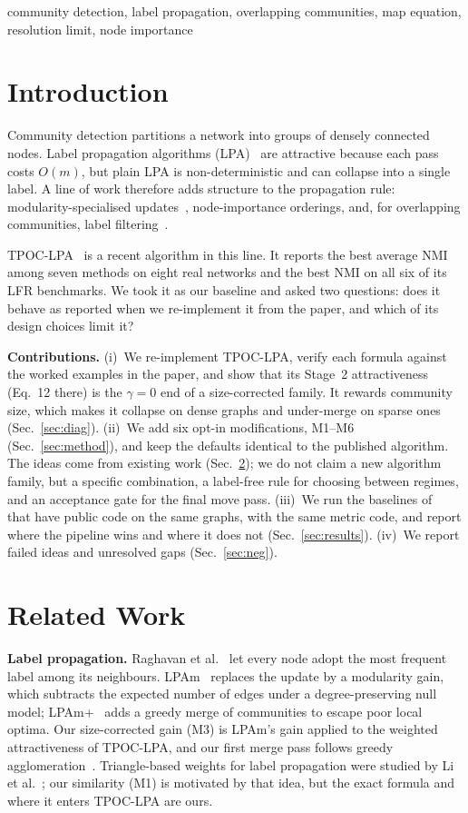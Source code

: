 \documentclass[conference]{IEEEtran}
\begin{document}
\begin{IEEEkeywords}
community detection, label propagation, overlapping communities, map equation, resolution limit, node importance
\end{IEEEkeywords}

\section{Introduction}
Community detection partitions a network into groups of densely connected nodes. Label propagation algorithms (LPA)~\cite{raghavan2007} are attractive because each pass costs $O(m)$, but plain LPA is non-deterministic and can collapse into a single label. A line of work therefore adds structure to the propagation rule: modularity-specialised updates~\cite{barber2009,liu2010}, node-importance orderings, and, for overlapping communities, label filtering~\cite{gregory2010,xie2011}.

TPOC-LPA~\cite{kong2026} is a recent algorithm in this line. It reports the best average NMI among seven methods on eight real networks and the best NMI on all six of its LFR benchmarks. We took it as our baseline and asked two questions: does it behave as reported when we re-implement it from the paper, and which of its design choices limit it?

\textbf{Contributions.}
(i)~We re-implement TPOC-LPA, verify each formula against the worked examples in the paper, and show that its Stage~2 attractiveness (Eq.~12 there) is the $\gamma{=}0$ end of a size-corrected family. It rewards community size, which makes it collapse on dense graphs and under-merge on sparse ones (Sec.~\ref{sec:diag}).
(ii)~We add six opt-in modifications, M1--M6 (Sec.~\ref{sec:method}), and keep the defaults identical to the published algorithm. The ideas come from existing work (Sec.~\ref{sec:related}); we do not claim a new algorithm family, but a specific combination, a label-free rule for choosing between regimes, and an acceptance gate for the final move pass.
(iii)~We run the baselines of~\cite{kong2026} that have public code on the same graphs, with the same metric code, and report where the pipeline wins and where it does not (Sec.~\ref{sec:results}).
(iv)~We report failed ideas and unresolved gaps (Sec.~\ref{sec:neg}).

\section{Related Work}\label{sec:related}
\textbf{Label propagation.} Raghavan et al.~\cite{raghavan2007} let every node adopt the most frequent label among its neighbours. LPAm~\cite{barber2009} replaces the update by a modularity gain, which subtracts the expected number of edges under a degree-preserving null model; LPAm+~\cite{liu2010} adds a greedy merge of communities to escape poor local optima. Our size-corrected gain (M3) is LPAm's gain applied to the weighted attractiveness of TPOC-LPA, and our first merge pass follows greedy agglomeration~\cite{clauset2004}. Triangle-based weights for label propagation were studied by Li et al.~\cite{li2020motif}; our similarity (M1) is motivated by that idea, but the exact formula and where it enters TPOC-LPA are ours.
\end{document}

